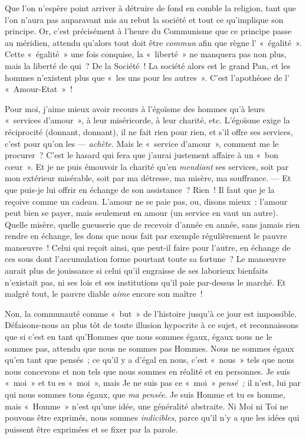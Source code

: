 \documentclass[french,twoside]{book} %
\begin{document}
Que l’on n’espère point arriver à détruire de fond en comble la religion, tant que l’on n’aura pas auparavant mis au rebut la société et tout ce qu’implique son principe. Or, c’est précisément à l’heure du Communisme que ce principe passe au méridien, attendu qu’alors tout doit être \emph{commun} afin que règne l’ « égalité ». Cette « égalité » une fois conquise, la « liberté » ne manquera pas non plus, mais la liberté de qui ? De la Société ! La société alors est le grand Pan, et les hommes n’existent plus que « les uns pour les autres ». C’est l’apothéose de l’ « Amour-Etat » !\par
Pour moi, j’aime mieux avoir recours à l’égoïsme des hommes qu’à leurs « services d’amour », à leur miséricorde, à leur charité, etc. L’égoïsme exige la réciprocité (donnant, donnant), il ne fait rien pour rien, et s’il offre ses services, c’est pour qu’on les — \emph{achète.} Mais le « service d’amour », comment me le procurer ? C’est le hasard qui fera que j’aurai justement affaire à un « bon cœur ». Et je ne puis émouvoir la charité qu’en \emph{mendiant} ses services, soit par mon extérieur misérable, soit par ma détresse, ma misère, ma souffrance. — Et que puis-je lui offrir en échange de son assistance ? Rien ! Il faut que je la reçoive comme un cadeau. L’amour ne se paie pas, ou, disons  mieux : l’amour peut bien se payer, mais seulement en amour (un service en vaut un autre). Quelle misère, quelle gueuserie que de recevoir d’année en année, sans jamais rien rendre en échange, les dons que nous fait par exemple régulièrement le pauvre manœuvre ! Celui qui reçoit ainsi, que peut-il faire pour l’autre, en échange de ces sous dont l’accumulation forme pourtant toute sa fortune ? Le manœuvre aurait plus de jouissance si celui qu’il engraisse de ses laborieux bienfaits n’existait pas, ni ses lois et ses institutions qu’il paie par-dessus le marché. Et malgré tout, le pauvre diable \emph{aime} encore son maître !\par
Non, la communauté comme « but » de l’histoire jusqu’à ce jour est impossible. Défaisons-nous au plus tôt de toute illusion hypocrite à ce sujet, et reconnaissons que si c’est en tant qu’Hommes que nous sommes égaux, égaux nous ne le sommes pas, attendu que nous ne sommes pas Hommes. Nous ne sommes égaux qu’en tant que pensés ; ce qu’il y a d’égal en nous, c’est « nous » tels que nous nous concevons et non tels que nous sommes en réalité et en personnes. Je suis « moi » et tu es « moi », mais Je ne suis pas ce « moi » \emph{pensé ;} il n’est, lui par qui nous sommes tous égaux, que \emph{ma pensée}. Je suis Homme et tu es homme, mais « Homme » n’est qu’une idée, une généralité abstraite. Ni Moi ni Toi ne pouvons être exprimés, nous sommes \emph{indicibles}, parce qu’il n’y a que les idées qui puissent être exprimées et se fixer par la parole.\par
\end{document}
